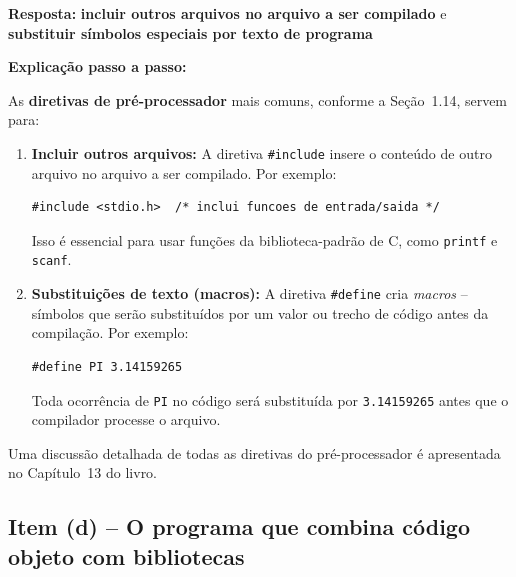 \documentclass[12pt,a4paper]{article}
\begin{document}
\begin{respostabox}
\textbf{Resposta:} \textcolor{deitelblue}{\textbf{incluir outros arquivos no arquivo a ser compilado} e \textbf{substituir símbolos especiais por texto de programa}}

\medskip
\textbf{Explicação passo a passo:}

As \textbf{diretivas de pré-processador} mais comuns, conforme a Seção~1.14, servem para:

\begin{enumerate}
  \item \textbf{Incluir outros arquivos:} A diretiva \texttt{\#include} insere o conteúdo de
  outro arquivo no arquivo a ser compilado. Por exemplo:
  \begin{lstlisting}
#include <stdio.h>  /* inclui funcoes de entrada/saida */
  \end{lstlisting}
  Isso é essencial para usar funções da biblioteca-padrão de C, como \texttt{printf} e
  \texttt{scanf}.

  \item \textbf{Substituições de texto (macros):} A diretiva \texttt{\#define} cria
  \textit{macros} -- símbolos que serão substituídos por um valor ou trecho de código
  antes da compilação. Por exemplo:
  \begin{lstlisting}
#define PI 3.14159265
  \end{lstlisting}
  Toda ocorrência de \texttt{PI} no código será substituída por \texttt{3.14159265}
  antes que o compilador processe o arquivo.
\end{enumerate}

Uma discussão detalhada de todas as diretivas do pré-processador é apresentada no
Capítulo~13 do livro.
\end{respostabox}

\bigskip

\subsection*{Item (d) -- O programa que combina código objeto com bibliotecas}
\end{document}
